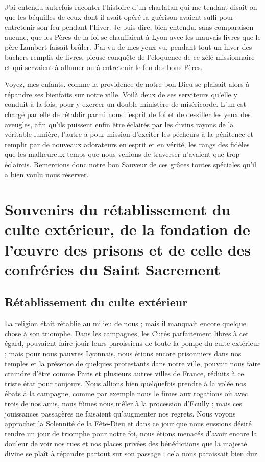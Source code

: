 \documentclass[11pt,a4paper]{report}
\begin{document}
J'ai entendu autrefois raconter l'histoire d'un charlatan qui me tendant disait-on que les béquilles de ceux dont il avait opéré la guérison avaient suffi pour entretenir son feu pendant l'hiver. Je puis dire, bien entendu, sans comparaison aucune, que les Pères de la foi se chauffaient à Lyon avec les mauvais livres que le père Lambert faisait brûler. J'ai vu de mes yeux vu, pendant tout un hiver des buchers remplis de livres, pieuse conquête de l'éloquence de ce zélé missionnaire et qui servaient à allumer ou à entretenir le feu des bons Pères.

Voyez, mes enfants, comme la providence de notre bon Dieu se plaisait alors à répandre ses bienfaits sur notre ville. Voilà deux de ses serviteurs qu'elle y conduit à la fois, pour y exercer un double ministère de miséricorde. L'un est chargé par elle de rétablir parmi nous l'esprit de foi et de dessiller les yeux des aveugles, afin qu'ils puissent enfin être éclairés par les divins rayons de la véritable lumière, l'autre a pour mission d'exciter les pécheurs à la pénitence et remplir par de nouveaux adorateurs en esprit et en vérité, les rangs des fidèles que les malheureux temps que nous venions de traverser n'avaient que trop éclaircis. Remercions donc notre bon Sauveur de ces grâces toutes spéciales qu'il a bien voulu nous réserver.

\chapter{Souvenirs du rétablissement du culte extérieur, de la fondation de l'œuvre des prisons et de celle des confréries du Saint Sacrement}

\section*{Rétablissement du culte extérieur}

La religion était rétablie au milieu de nous ; mais il manquait encore quelque chose à son triomphe. Dans les campagnes, les Curés parfaitement libres à cet égard, pouvaient faire jouir leurs paroissiens de toute la pompe du culte extérieur ; mais pour nous pauvres Lyonnais, nous étions encore prisonniers dans nos temples et la présence de quelques protestants dans notre ville, pouvait nous faire craindre d'être comme Paris et plusieurs autres villes de France, réduits à ce triste état pour toujours. Nous allions bien quelquefois prendre à la volée nos ébats à la campagne, comme par exemple nous le fîmes aux rogations où avec trois de nos amis, nous fûmes nous mêler à la procession d'Ecully ; mais ces jouissances passagères ne faisaient qu'augmenter nos regrets. Nous voyons approcher la Solennité de la Fête-Dieu et dans ce jour que nous eussions désiré rendre un jour de triomphe pour notre foi, nous étions menacés d'avoir encore la douleur de voir nos rues et nos places privées des bénédictions que la majesté divine se plaît à répandre partout sur son passage ; cela nous paraissait bien dur.
\end{document}
